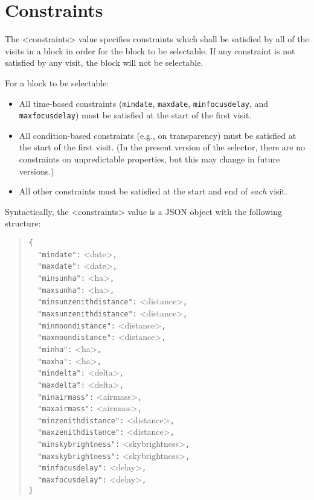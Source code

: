 \section{Constraints}

The <constraints> value specifies constraints which shall be satisfied by all of the visits in a block in order for the block to be selectable. If any constraint is not satisfied by any visit, the block will not be selectable.

For a block to be selectable:
\begin{itemize}
    \item All time-based constraints (\verb|mindate|, \verb|maxdate|, \verb|minfocusdelay|, and \verb|maxfocusdelay|) must be satisfied at the start of the first visit.
    \item All condition-based constraints (e.g., on transparency) must be satisfied at the start of the first visit.  (In the present version of the selector, there are no constraints on unpredictable properties, but this may change in future versions.)
    \item All other constraints must be satisfied at the start and end of \emph{each} visit.
\end{itemize}

Syntactically, the <constraints> value is a JSON object with the following structure:
\begin{quote}
\verb|{|\\
\verb|  "mindate":| <date>\verb|,|\\
\verb|  "maxdate":| <date>\verb|,|\\
\verb|  "minsunha":| <ha>\verb|,|\\
\verb|  "maxsunha":| <ha>\verb|,|\\
\verb|  "minsunzenithdistance":| <distance>\verb|,|\\
\verb|  "maxsunzenithdistance":| <distance>\verb|,|\\
\verb|  "minmoondistance":| <distance>\verb|,|\\
\verb|  "maxmoondistance":| <distance>\verb|,|\\
\verb|  "minha":| <ha>\verb|,|\\
\verb|  "maxha":| <ha>\verb|,|\\
\verb|  "mindelta":| <delta>\verb|,|\\
\verb|  "maxdelta":| <delta>\verb|,|\\
\verb|  "minairmass":| <airmass>\verb|,|\\
\verb|  "maxairmass":| <airmass>\verb|,|\\
\verb|  "minzenithdistance":| <distance>\verb|,|\\
\verb|  "maxzenithdistance":| <distance>\verb|,|\\
\verb|  "minskybrightness":| <skybrightness>\verb|,|\\
\verb|  "maxskybrightness":| <skybrightness>\verb|,|\\
\verb|  "minfocusdelay":| <delay>\verb|,|\\
\verb|  "maxfocusdelay":| <delay>\verb|,|\\
\verb|}|
\end{quote}

